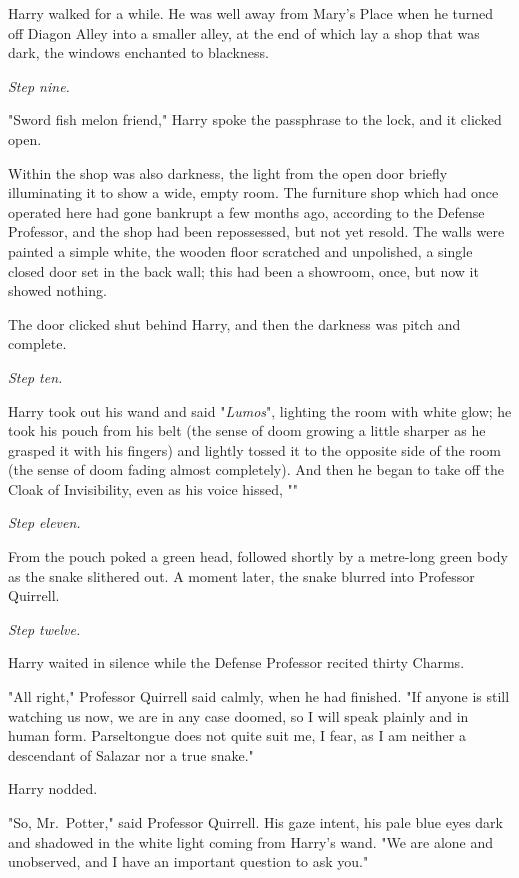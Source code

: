 Harry walked for a while. He was well away from Mary's Place when he turned off
Diagon Alley into a smaller alley, at the end of which lay a shop that was
dark, the windows enchanted to blackness.

\emph{Step nine.}

"Sword fish melon friend," Harry spoke the passphrase to the lock, and it
clicked open.

Within the shop was also darkness, the light from the open door briefly
illuminating it to show a wide, empty room. The furniture shop which had once
operated here had gone bankrupt a few months ago, according to the Defense
Professor, and the shop had been repossessed, but not yet resold. The walls
were painted a simple white, the wooden floor scratched and unpolished, a
single closed door set in the back wall; this had been a showroom, once, but
now it showed nothing.

The door clicked shut behind Harry, and then the darkness was pitch and
complete.

\emph{Step ten.}

Harry took out his wand and said "\emph{Lumos}", lighting the room with white
glow; he took his pouch from his belt (the sense of doom growing a little
sharper as he grasped it with his fingers) and lightly tossed it to the
opposite side of the room (the sense of doom fading almost completely). And
then he began to take off the Cloak of Invisibility, even as his voice hissed,
""

\emph{Step eleven.}

From the pouch poked a green head, followed shortly by a metre-long green body
as the snake slithered out. A moment later, the snake blurred into Professor
Quirrell.

\emph{Step twelve.}

Harry waited in silence while the Defense Professor recited thirty Charms.

"All right," Professor Quirrell said calmly, when he had finished. "If anyone
is still watching us now, we are in any case doomed, so I will speak plainly
and in human form. Parseltongue does not quite suit me, I fear, as I am neither
a descendant of Salazar nor a true snake."

Harry nodded.

"So, Mr.~Potter," said Professor Quirrell. His gaze intent, his pale blue eyes
dark and shadowed in the white light coming from Harry's wand. "We are alone
and unobserved, and I have an important question to ask you."

